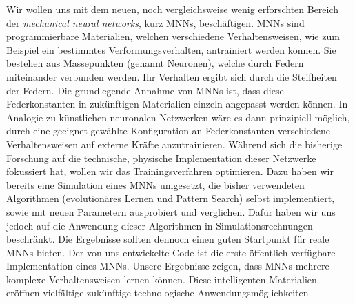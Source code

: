\documentclass[10pt]{scrartcl}
\newcommand*{\eng}[1]{\textit{#1}}
\newcommand*{\feng}[1]{\eng{#1}}
\begin{document}
Wir wollen uns mit dem neuen, noch vergleichsweise wenig erforschten Bereich der \feng{mechanical neural networks}, kurz MNNs, beschäftigen.
MNNs sind programmierbare Materialien, welchen verschiedene Verhaltensweisen, wie zum Beispiel ein bestimmtes Verformungsverhalten, antrainiert werden können. Sie bestehen aus Massepunkten (genannt Neuronen), welche durch Federn miteinander verbunden werden. Ihr Verhalten ergibt sich durch die Steifheiten der Federn.
Die grundlegende Annahme von MNNs ist, dass diese Federkonstanten in zukünftigen Materialien einzeln angepasst werden können. 
In Analogie zu künstlichen neuronalen Netzwerken wäre es dann prinzipiell möglich, durch eine geeignet gewählte Konfiguration an Federkonstanten verschiedene Verhaltensweisen auf externe Kräfte anzutrainieren.
Während sich die bisherige Forschung auf die technische, physische Implementation dieser Netzwerke fokussiert hat, wollen wir das Trainingsverfahren optimieren.
Dazu haben wir bereits eine Simulation eines MNNs umgesetzt, die bisher verwendeten Algorithmen (evolutionäres Lernen und Pattern Search) selbst implementiert, sowie mit neuen Parametern ausprobiert und verglichen. 
Dafür haben wir uns jedoch auf die Anwendung dieser Algorithmen in Simulationsrechnungen beschränkt. Die Ergebnisse sollten dennoch einen guten Startpunkt für reale MNNs bieten. Der von uns entwickelte Code ist die erste öffentlich verfügbare Implementation eines MNNs.
Unsere Ergebnisse zeigen, dass MNNs mehrere komplexe Verhaltensweisen lernen können. Diese intelligenten Materialien %
eröffnen vielfältige zukünftige technologische Anwendungsmöglichkeiten. %


\pagestyle{fancy}
\fancyhead{}
\fancyhead[L]{\rightmark}

\newpage

\pagestyle{fancy}
\fancyhead{}
\fancyhead[L]{\rightmark}





\end{document}
